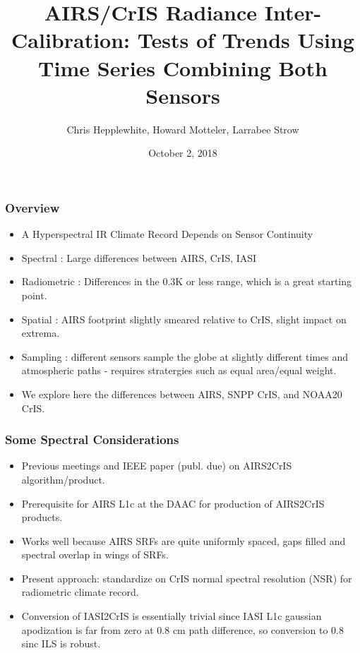 \documentclass[10pt,t]{beamer}
\begin{document}
\title[]{AIRS/CrIS Radiance Inter-Calibration: \newline
  Tests of Trends Using Time Series Combining Both Sensors}
\author{Chris Hepplewhite, Howard Motteler, Larrabee Strow}
\date{October 2, 2018}
\begin{frame}
  \titlepage
\end{frame}
\begin{frame}
  \frametitle{Overview}
  \begin{itemize}
  \item A Hyperspectral IR Climate Record Depends on Sensor Continuity
  \item Spectral : Large differences between AIRS, CrIS, IASI
  \item Radiometric : Differences in the 0.3K or less range, which is a great starting point.
  \item Spatial : AIRS footprint slightly smeared relative to CrIS, slight impact on extrema.
    \item Sampling : different sensors sample the globe at slightly different times and atmospheric paths - requires stratergies such as equal area/equal weight.
    \item We explore here the differences between AIRS, SNPP CrIS, and NOAA20 CrIS.

  \end{itemize}
\end{frame}
\begin{frame}
  \frametitle{Some Spectral Considerations}

  \begin{itemize}
  \item Previous meetings and IEEE paper (publ. due) on AIRS2CrIS algorithm/product.
  \item Prerequisite for AIRS L1c at the DAAC for production of AIRS2CrIS products.
    \item Works well because AIRS SRFs are quite uniformly spaced, gaps filled and spectral overlap in wings of SRFs.
  \item Present approach: standardize on CrIS normal spectral resolution (NSR) for radiometric climate record.
  \item Conversion of IASI2CrIS is essentially trivial since IASI L1c gaussian apodization is far from zero at 0.8 cm path difference, so conversion to 0.8 sinc ILS is robust.
    \end{itemize}

\end{frame}
\end{document}
